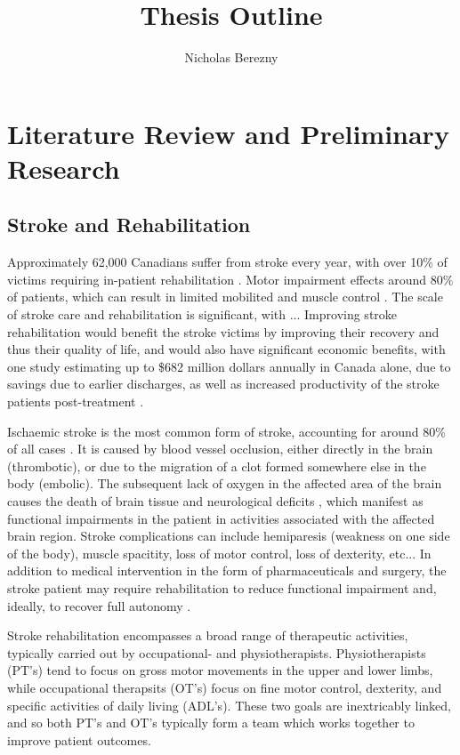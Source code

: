 \documentclass[12pt]{report}
\author{Nicholas Berezny}
\title{Thesis Outline}
\begin{document}
\maketitle
\newpage

\chapter{Literature Review and Preliminary Research}

\section{Stroke and Rehabilitation}
Approximately 62,000 Canadians suffer from stroke every year, with over 10\% of victims requiring in-patient rehabilitation \cite{Hebert2016}. Motor impairment effects around 80\% of patients, which can result in limited mobilited and muscle control \cite{Langhorne2009}. The scale of stroke care and rehabilitation is significant, with ... Improving stroke rehabilitation would benefit the stroke victims by improving their recovery and thus their quality of life, and would also have significant economic benefits, with one study estimating up to \$682 million dollars annually in Canada alone, due to savings due to earlier discharges, as well as increased productivity of the stroke patients post-treatment \cite{Krueger2012}. 

Ischaemic stroke is the most common form of stroke, accounting for around 80\% of all cases \cite{Rey2008}. It is caused by blood vessel occlusion, either directly in the brain (thrombotic), or due to the migration of a clot formed somewhere else in the body (embolic). The subsequent lack of oxygen in the affected area of the brain causes the death of brain tissue and neurological deficits \cite{Prabhakaran2015}, which manifest as functional impairments in the patient in activities associated with the affected brain region. Stroke complications can include hemiparesis (weakness on one side of the body), muscle spacitity, loss of motor control, loss of dexterity, etc... In addition to medical intervention in the form of pharmaceuticals and surgery, the stroke patient may require rehabilitation to reduce functional impairment and, ideally, to recover full autonomy \cite{Stroke}.

Stroke rehabilitation encompasses a broad range of therapeutic activities, typically carried out by occupational- and physiotherapists. Physiotherapists (PT's) tend to focus on gross motor movements in the upper and lower limbs, while occupational therapsits (OT's) focus on fine motor control, dexterity, and specific activities of daily living (ADL's). These two goals are inextricably linked, and so both PT's and OT's typically form a team which works together to improve patient outcomes. 
\end{document}

